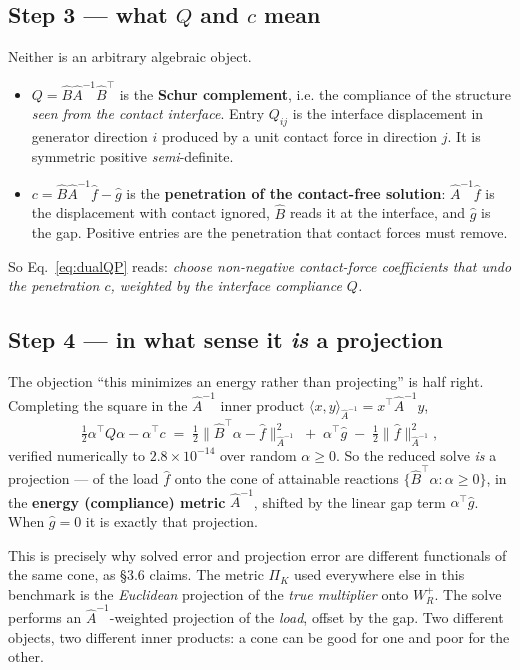 \documentclass[11pt,a4paper]{article}
\begin{document}
\subsection*{Step 3 --- what $Q$ and $c$ mean}
Neither is an arbitrary algebraic object.
\begin{itemize}
\item $Q=\hat B\hat A^{-1}\hat B^{\!\top}$ is the \textbf{Schur complement}, i.e. the
compliance of the structure \emph{seen from the contact interface}. Entry $Q_{ij}$ is the
interface displacement in generator direction $i$ produced by a unit contact force in
direction $j$. It is symmetric positive \emph{semi}-definite.
\item $c=\hat B\hat A^{-1}\hat f-\hat g$ is the \textbf{penetration of the contact-free
solution}: $\hat A^{-1}\hat f$ is the displacement with contact ignored, $\hat B$ reads it
at the interface, and $\hat g$ is the gap. Positive entries are the penetration that
contact forces must remove.
\end{itemize}
So Eq.~\eqref{eq:dualQP} reads: \emph{choose non-negative contact-force coefficients that
undo the penetration $c$, weighted by the interface compliance $Q$.}

\subsection*{Step 4 --- in what sense it \emph{is} a projection}
The objection ``this minimizes an energy rather than projecting'' is half right. Completing
the square in the $\hat A^{-1}$ inner product $\langle x,y\rangle_{\hat A^{-1}}=x^{\!\top}\hat A^{-1}y$,
\begin{equation}
\tfrac12\alpha^{\!\top}Q\alpha-\alpha^{\!\top}c
\;=\;\tfrac12\bigl\|\hat B^{\!\top}\alpha-\hat f\bigr\|^{2}_{\hat A^{-1}}
\;+\;\alpha^{\!\top}\hat g
\;-\;\tfrac12\bigl\|\hat f\bigr\|^{2}_{\hat A^{-1}} ,
\label{eq:proj}
\end{equation}
verified numerically to $2.8\times10^{-14}$ over random $\alpha\ge0$. So the reduced solve
\emph{is} a projection --- of the load $\hat f$ onto the cone of attainable reactions
$\{\hat B^{\!\top}\alpha:\alpha\ge0\}$, in the \textbf{energy (compliance) metric}
$\hat A^{-1}$, shifted by the linear gap term $\alpha^{\!\top}\hat g$. When $\hat g=0$ it
is exactly that projection.

This is precisely why solved error and projection error are different functionals of the
same cone, as \S3.6 claims. The metric $\Pi_K$ used everywhere else in this benchmark is
the \emph{Euclidean} projection of the \emph{true multiplier} onto $W_R^+$. The solve
performs an $\hat A^{-1}$-weighted projection of the \emph{load}, offset by the gap. Two
different objects, two different inner products: a cone can be good for one and poor for
the other.
\end{document}

